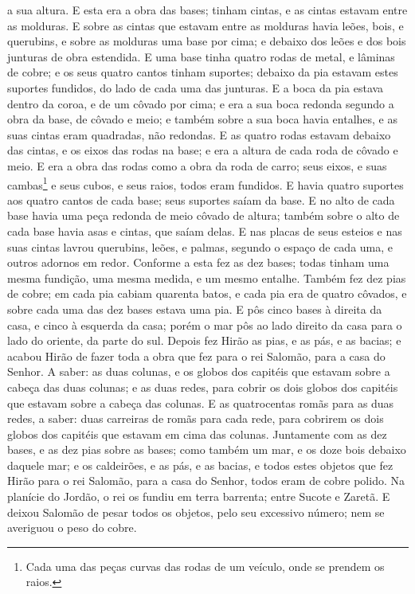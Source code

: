 a sua altura.
 E esta era a obra das bases; tinham cintas, e as cintas estavam
entre as molduras. E sobre as cintas que estavam entre as
molduras havia leões, bois, e querubins, e sobre as molduras uma
base por cima; e debaixo dos leões e dos bois junturas de obra
estendida. E uma base tinha quatro rodas de metal, e lâminas
de cobre; e os seus quatro cantos tinham suportes; debaixo da pia
estavam estes suportes fundidos, do lado de cada uma das junturas.
E a boca da pia estava dentro da coroa, e de um côvado por
cima; e era a sua boca redonda segundo a obra da base, de côvado e
meio; e também sobre a sua boca havia entalhes, e as suas cintas
eram quadradas, não redondas. E as quatro rodas estavam
debaixo das cintas, e os eixos das rodas na base; e era a altura de
cada roda de côvado e meio. E era a obra das rodas como a
obra da roda de carro; seus eixos, e suas cambas\footnote{Cada uma
das peças curvas das rodas de um veículo, onde se prendem os raios.}
e seus cubos, e seus raios, todos eram fundidos. E havia
quatro suportes aos quatro cantos de cada base; seus suportes saíam
da base. E no alto de cada base havia uma peça redonda de
meio côvado de altura; também sobre o alto de cada base havia asas e
cintas, que saíam delas. E nas placas de seus esteios e nas
suas cintas lavrou querubins, leões, e palmas, segundo o espaço de
cada uma, e outros adornos em redor. Conforme a esta fez as
dez bases; todas tinham uma mesma fundição, uma mesma medida, e um
mesmo entalhe. Também fez dez pias de cobre; em cada pia
cabiam quarenta batos, e cada pia era de quatro côvados, e sobre
cada uma das dez bases estava uma pia. E pôs cinco bases à
direita da casa, e cinco à esquerda da casa; porém o mar pôs ao lado
direito da casa para o lado do oriente, da parte do sul.
Depois fez Hirão as pias, e as pás, e as bacias; e acabou
Hirão de fazer toda a obra que fez para o rei Salomão, para a casa
do Senhor. A saber: as duas colunas, e os globos dos capitéis
que estavam sobre a cabeça das duas colunas; e as duas redes, para
cobrir os dois globos dos capitéis que estavam sobre a cabeça das
colunas. E as quatrocentas romãs para as duas redes, a saber:
duas carreiras de romãs para cada rede, para cobrirem os dois globos
dos capitéis que estavam em cima das colunas. Juntamente com
as dez bases, e as dez pias sobre as bases; como também um
mar, e os doze bois debaixo daquele mar; e os caldeirões, e
as pás, e as bacias, e todos estes objetos que fez Hirão para o rei
Salomão, para a casa do Senhor, todos eram de cobre polido.
Na planície do Jordão, o rei os fundiu em terra barrenta;
entre Sucote e Zaretã. E deixou Salomão de pesar todos os
objetos, pelo seu excessivo número; nem se averiguou o peso do
cobre.

